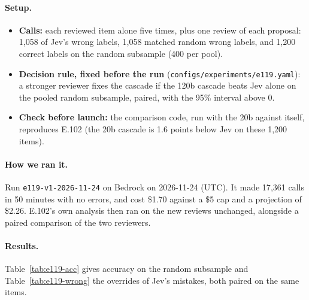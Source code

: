\documentclass[11pt]{article}
\renewcommand{\_}{\origunderscore\allowbreak}
\begin{document}
\paragraph{Setup.}
\begin{itemize}[leftmargin=*]
  \item \textbf{Calls:} each reviewed item alone five times, plus one review of each proposal: 1{,}058 of Jev's wrong labels, 1{,}058 matched random wrong labels, and 1{,}200 correct labels on the random subsample (400 per pool).
  \item \textbf{Decision rule, fixed before the run} (\texttt{configs/experiments/e119.yaml}): a stronger reviewer fixes the cascade if the 120b cascade beats Jev alone on the pooled random subsample, paired, with the 95\% interval above 0.
  \item \textbf{Check before launch:} the comparison code, run with the 20b against itself, reproduces E.102 (the 20b cascade is 1.6 points below Jev on these 1{,}200 items).
\end{itemize}

\paragraph{How we ran it.}
Run \texttt{e119-v1-2026-11-24} on Bedrock on 2026-11-24 (UTC). It made 17{,}361 calls in 50 minutes with no errors, and cost \$1.70 against a \$5 cap and a projection of \$2.26. E.102's own analysis then ran on the new reviews unchanged, alongside a paired comparison of the two reviewers.

\paragraph{Results.}
Table~\ref{tab:e119-acc} gives accuracy on the random subsample and Table~\ref{tab:e119-wrong} the overrides of Jev's mistakes, both paired on the same items.
\end{document}

